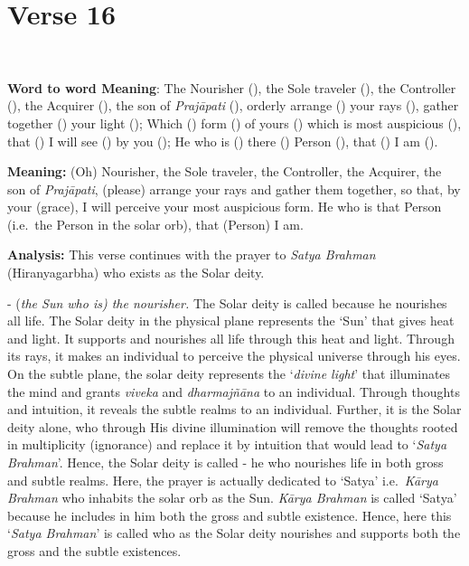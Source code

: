 \chapter{Verse 16}

\begin{moolashloka}
\\
\end{moolashloka}

\textbf{Word to word Meaning}: The Nourisher (), the Sole traveler (), the Controller (), the Acquirer (), the son of \emph{Prajāpati} (), orderly arrange () your rays (), gather together () your light (); Which () form () of yours () which is most auspicious (), that () I will see () by you (); He who is () there () Person (), that () I am ().

\textbf{Meaning:} (Oh) Nourisher, the Sole traveler, the Controller, the Acquirer, the son of \emph{Prajāpati}, (please) arrange your rays and gather them together, so that, by your (grace), I will perceive your most auspicious form. He who is that Person (i.e.\ the Person in the solar orb), that (Person) I am.

\textbf{Analysis:} This verse continues with the prayer to \emph{Satya Brahman} (Hiranyagarbha) who exists as the Solar deity.

- (\emph{the Sun who is) the nourisher.} The Solar deity is called  because he nourishes all life. The Solar deity in the physical plane represents the `Sun' that gives heat and light. It supports and nourishes all life through this heat and light. Through its rays, it makes an individual to perceive the physical universe through his eyes. On the subtle plane, the solar deity represents the `\emph{divine light}' that illuminates the mind and grants \emph{viveka} and \emph{dharmajñāna} to an individual. Through thoughts and intuition, it reveals the subtle realms to an individual. Further, it is the Solar deity alone, who through His divine illumination will remove the thoughts rooted in multiplicity (ignorance) and replace it by intuition that would lead to `\emph{Satya Brahman}'. Hence, the Solar deity is called - he who nourishes life in both gross and subtle realms. Here, the prayer is actually dedicated to `Satya' i.e.\ \emph{Kārya Brahman} who inhabits the solar orb as the Sun. \emph{Kārya Brahman} is called `Satya' because he includes in him both the gross and subtle existence. Hence, here this `\emph{Satya Brahman}' is called  who as the Solar deity nourishes and supports both the gross and the subtle existences.
\vskip 2pt

